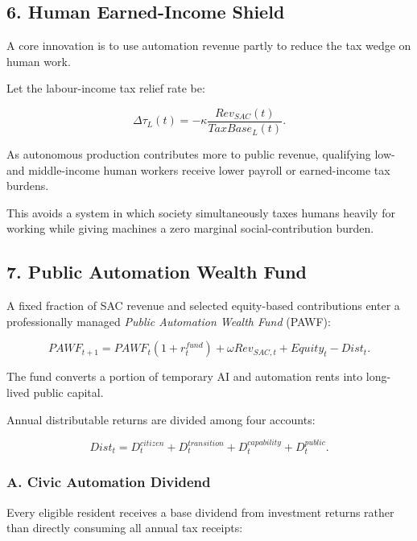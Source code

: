 \documentclass[conference]{IEEEtran}
\begin{document}
\subsection{6. Human Earned-Income Shield}

A core innovation is to use automation revenue partly to reduce the tax wedge on
human work.

Let the labour-income tax relief rate be:

\begin{equation}
\Delta \tau_L(t) =
-\kappa
\frac{Rev_{SAC}(t)}{TaxBase_L(t)}.
\end{equation}

As autonomous production contributes more to public revenue, qualifying
low- and middle-income human workers receive lower payroll or earned-income
tax burdens.

This avoids a system in which society simultaneously taxes humans heavily for
working while giving machines a zero marginal social-contribution burden.

\subsection{7. Public Automation Wealth Fund}

A fixed fraction of SAC revenue and selected equity-based contributions enter a
professionally managed \textit{Public Automation Wealth Fund} (PAWF):

\begin{equation}
PAWF_{t+1}
=
PAWF_t(1+r_t^{fund})
+\omega Rev_{SAC,t}
+Equity_t
-Dist_t.
\end{equation}

The fund converts a portion of temporary AI and automation rents into long-lived
public capital.

Annual distributable returns are divided among four accounts:

\begin{equation}
Dist_t =
D^{citizen}_t+
D^{transition}_t+
D^{capability}_t+
D^{public}_t.
\end{equation}

\subsubsection{A. Civic Automation Dividend}

Every eligible resident receives a base dividend from investment returns rather
than directly consuming all annual tax receipts:
\end{document}
